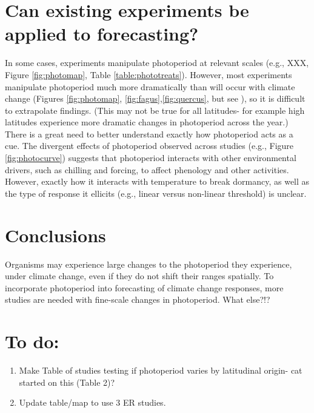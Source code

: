 \documentclass{article}
\begin{document}
\section*{Can existing experiments be applied to forecasting?}
In some cases, experiments manipulate photoperiod at relevant scales (e.g., XXX, Figure \ref{fig:photomap}, Table \ref{table:phototreats}). However, most experiments manipulate photoperiod much more dramatically than will occur with climate change (Figures \ref{fig:photomap}, \ref{fig:fagus},\ref{fig:quercus}, but see \citep{Basler:2012}), so it is difficult to extrapolate findings. (This may not be true for all latitudes- for example high latitudes experience more dramatic changes in photoperiod across the year.)
There is a great need to better understand exactly how photoperiod acts as a cue. The divergent effects of photoperiod observed across studies (e.g., Figure \ref{fig:photocurve}) suggests that photoperiod interacts with other environmental drivers, such as chilling and forcing, to affect phenology and other activities. However, exactly how it interacts with temperature to break dormancy, as well as the type of response it ellicits (e.g., linear versus non-linear threshold) is unclear. 
\section*{Conclusions}
Organisms may experience large changes to the photoperiod they experience, under climate change, even if they do not shift their ranges spatially. To incorporate photoperiod into forecasting of climate change responses, more studies are needed with fine-scale changes in photoperiod. What else?!?


\section* {To do:}
\begin{enumerate}
\item Make Table of studies testing if photoperiod varies by latitudinal origin- cat started on this (Table 2)?
\item Update table/map to use 3 ER studies.
\end{enumerate}
\end{document}
